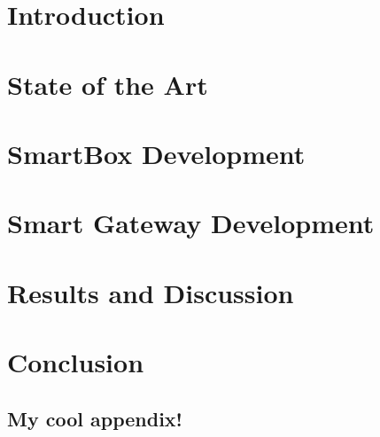 \documentclass[a4paper, 12pt]{report}
\begin{document}
\newpage
\thispagestyle{empty}
\mbox{}
\chapter{Introduction}


\chapter{State of the Art}
\label{chap:stateofart}


\chapter{SmartBox Development}
\label{chap:smartbox}


\chapter{Smart Gateway Development}
\label{chap:gateway}


\chapter{Results and Discussion}
\label{chap:results}


\chapter{Conclusion}
\label{chap:conclusion}






\titleformat{\chapter}[display]	%
{\normalfont\huge\bfseries}{\chaptertitlename\ \thechapter}{20pt}{\Huge}
\begin{appendix}			%
\chapter{My cool appendix!}	%
\label{app:cool}
%
%
\end{appendix}
\end{document}
